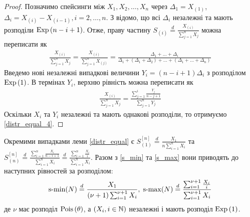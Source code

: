 \begin{proof}
    Позначимо спейсинги між $X_1, X_2, \dots, X_n$ через
    $\Delta_1 = X_{(1)}$,
    $\Delta_i = X_{(i)} - X_{(i-1)}, i=2, \dots, n$. З \cite{Arnold_et_al_2008} відомо, що
    всі $\Delta_i$ незалежні та мають розподіли $\mathrm{Exp}\left(n-i+1\right)$.
    Отже, праву частину $S_{(i)} \overset{d}{=} \frac{X_{(i)}}{\sum_{j=1}^{n}X_j}$
    можна переписати як
    \begin{gather*}
        \frac{X_{(i)}}{\sum_{j=1}^{n}X_j} = 
        \frac{X_{(i)}}{\sum_{j=1}^{n}X_{(j)}} = 
        \frac{
            \Delta_1 + \dots + \Delta_i
        }{
            \Delta_1 + \left(\Delta_1 + \Delta_2\right) +
            \dots + \left(\Delta_1 + \dots + \Delta_n\right)
        }
    \end{gather*}
    Введемо нові незалежні випадкові величини
    $Y_i = (n-i+1)\Delta_i$ з розподілом
    $\mathrm{Exp}\left(1\right)$. В термінах $Y_i$,
    верхню рівність можна переписати як
    \begin{gather*}
        \frac{X_{(i)}}{\sum_{j=1}^{n}X_j} = 
        \frac{
            \sum_{j=1}^i \frac{Y_j}{n-j+1} 
        }{
            \sum_{j=1}^n Y_j
        }
    \end{gather*}
    Оскільки $X_i$ та $Y_i$ незалежні та мають однакові розподіли, то отримуємо \eqref{distr_equal_4}.
\end{proof}

Окремими випадками леми \ref{distr_equal}
є $S_{(1)}^{[n]} \overset{d}{=} \frac{X_1}{n\sum_{i=1}^n X_i}$
та $S_{(n)}^{[n]} \overset{d}{=} \frac{\sum_{i=1}^n \frac{X_i}{n-i+1}}{\sum_{i=1}^n X_i}
\overset{d}{=} \frac{\sum_{i=1}^n \frac{X_i}{i}}{\sum_{i=1}^n X_i}$.
Разом з \eqref{s_min} та \eqref{s_max}
вони приводять до наступних рівностей за розподілом:
\begin{gather}\label{distr_equal_5}
    \operatorname{s-min}(N) \overset{d}{=}
    \frac{X_1}{(\nu+1)\sum_{i=1}^{\nu+1} X_i} , \;
    \operatorname{s-max}(N) \overset{d}{=} 
    \frac{\sum_{i=1}^{\nu+1} \frac{X_i}{i}}{\sum_{i=1}^{\nu+1} X_i}
\end{gather}
де $\nu$ має розподіл $\mathrm{Pois}\left(\theta\right)$, а $\left(X_i, i\in\mathbb{N}\right)$ незалежні і мають розподіл $\mathrm{Exp}\left(1\right)$.

